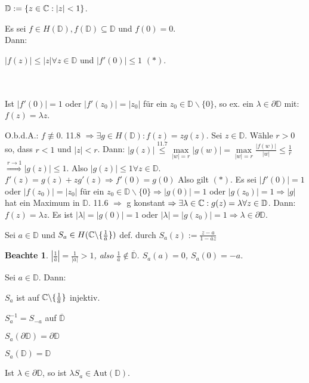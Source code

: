 \documentclass[a4paper,twoside,DIV15,BCOR12mm]{scrbook}
\def\MdD{\mathbb{D}}
\def\Rand{\partial}
\def\Aut{\text{Aut}}
\newtheorem{beachte}{Beachte}
\begin{document}
$\MdD := \{ z\in\MdC: |z|<1\}$.

\begin{satz}
Es sei $f\in H(\MdD), f(\MdD) \subseteq \MdD$ und $f(0) = 0$. \\
Dann: \\  \centerline{$|f(z)| \leq |z| \forall z \in \MdD$ und $|f'(0)|\leq 1$ $(*)$. } \\  \\ Ist $|f'(0)|=1$ oder $|f'(z_0)| = |z_0|$ für ein $z_0 \in \MdD \backslash \{0\}$, so ex. ein $\lambda \in \Rand \MdD$ mit: $f(z)=\lambda z$.
\end{satz}
\begin{beweis}
O.b.d.A.: $f\not\equiv 0$. 11.8 $\Rightarrow \exists g \in H(\MdD): f(z) = zg(z)$. Sei $z \in \MdD$. Wähle $r>0$ so, dass $r<1$ und $|z| < r$. Dann: $|g(z)| \stackrel{\text{11.7}}{\leq} \max\limits_{|w|=r} |g(w)| = \max\limits_{|w|=r} \frac{|f(w)|}{|w|} \leq \frac{1}{r} $ $\stackrel{r \rightarrow 1}{\Rightarrow} |g(z)| \leq1$. Also $|g(z)| \leq 1 \forall z \in \MdD$. 
$f'(z) = g(z) + zg'(z) \Rightarrow f'(0) = g(0)$ Also gilt $(*)$.
Es sei $|f'(0)| = 1$ oder $|f(z_0)| = |z_0|$ für ein $z_0 \in \MdD \backslash \{0\} \Rightarrow  |g(0)| = 1$ oder $|g(z_0)| = 1 \Rightarrow |g|$ hat ein Maximum in $\MdD$. 11.6 $\Rightarrow$ g konstant $\Rightarrow \exists \lambda \in \MdC: g(z) = \lambda \forall z \in \MdD$. Dann: $f(z) = \lambda z$. Es ist $|\lambda| = |g(0)| = 1$ oder $|\lambda| = |g(z_0)| = 1 \Rightarrow \lambda \in \partial \MdD$.
\end{beweis}

\begin{definition}
Sei $a\in\MdD$ und $S_a \in H(\mathbb{C} \backslash \{ \frac{1}{\overline{a}}\})$ def. durch $S_a(z) := \frac{z-a}{1-\overline{a}z}$
\end{definition}

\begin{beachte}
$|\frac{1}{\overline{a}}| = \frac{1}{|a|} > 1$, also $\frac{1}{\overline{a}} \notin \overline{\MdD}$. $S_a(a) = 0$, $S_a(0) = -a$.
\end{beachte}

\begin{satz}
Sei $a \in \MdD$. Dann:
\begin{liste}
\item $S_a$ ist auf $\mathbb{C} \backslash \{\frac{1}{\overline{a}}\}$ injektiv.
\item $S_a^{-1} = S_{-a}$ auf $\overline{\MdD}$
\item $S_a(\partial \MdD) = \partial \MdD$
\item $S_a(\MdD) = \MdD$
\item Ist $\lambda \in \partial \MdD$, so ist $\lambda S_a \in \Aut(\MdD)$.
\end{liste}
\end{satz}
\end{document}

